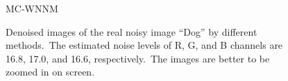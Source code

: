 \begin{figure}
{\begin{minipage}[t]{0.19\textwidth}
{\footnotesize MC-WNNM }
\end{minipage}
}
    \caption{Denoised images of the real noisy image ``Dog'' \cite{ncwebsite} by different methods.\ The estimated noise levels of R, G, and B channels are 16.8, 17.0, and 16.6, respectively.\ The images are better to be zoomed in on screen.}
    \label{fig4-8}
\end{figure}


\begin{figure}
    \centering
{}
\end{figure}
